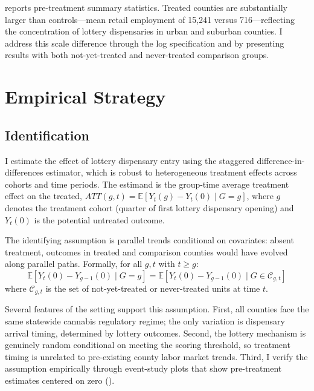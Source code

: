 \documentclass[12pt]{article}
\newcommand{\E}{\mathbb{E}}
\begin{document}
 reports pre-treatment summary statistics. Treated counties are substantially larger than controls---mean retail employment of 15,241 versus 716---reflecting the concentration of lottery dispensaries in urban and suburban counties. I address this scale difference through the log specification and by presenting results with both not-yet-treated and never-treated comparison groups.




\section{Empirical Strategy}
\label{sec:strategy}

\subsection{Identification}

I estimate the effect of lottery dispensary entry using the \citet{CallawayAndSantAnna2021} staggered difference-in-differences estimator, which is robust to heterogeneous treatment effects across cohorts and time periods. The estimand is the group-time average treatment effect on the treated, $ATT(g,t) = \E[Y_t(g) - Y_t(0) \mid G = g]$, where $g$ denotes the treatment cohort (quarter of first lottery dispensary opening) and $Y_t(0)$ is the potential untreated outcome.

The identifying assumption is parallel trends conditional on covariates: absent treatment, outcomes in treated and comparison counties would have evolved along parallel paths. Formally, for all $g, t$ with $t \geq g$:
\begin{equation}
\E[Y_t(0) - Y_{g-1}(0) \mid G = g] = \E[Y_t(0) - Y_{g-1}(0) \mid G \in \mathcal{C}_{g,t}]
\end{equation}
where $\mathcal{C}_{g,t}$ is the set of not-yet-treated or never-treated units at time $t$.

Several features of the setting support this assumption. First, all counties face the same statewide cannabis regulatory regime; the only variation is dispensary arrival timing, determined by lottery outcomes. Second, the lottery mechanism is genuinely random conditional on meeting the scoring threshold, so treatment timing is unrelated to pre-existing county labor market trends. Third, I verify the assumption empirically through event-study plots that show pre-treatment estimates centered on zero ().
\end{document}
